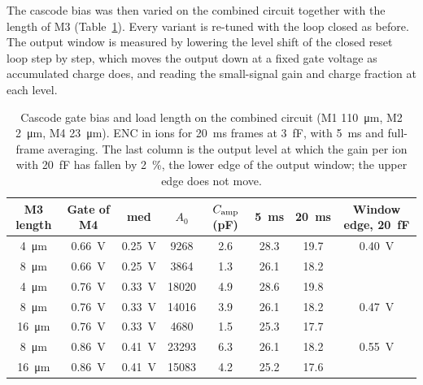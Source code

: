 \documentclass[11pt,a4paper]{article}
\begin{document}
The cascode bias was then varied on the combined circuit together with the
length of M3 (Table~\ref{tab:vh1casc}). Every variant is re-tuned with the
loop closed as before. The output window is measured by lowering the level
shift of the closed reset loop step by step, which moves the output down at
a fixed gate voltage as accumulated charge does, and reading the
small-signal gain and charge fraction at each level.
%
\begin{table}[htbp]\centering
\caption{Cascode gate bias and load length on the combined circuit (M1
\SI{110}{\um}, M2 \SI{2}{\um}, M4 \SI{23}{\um}). ENC in ions for
\SI{20}{ms} frames at \SI{3}{fF}, with \SI{5}{ms} and full-frame averaging.
The last column is the output level at which the gain per ion with
\SI{20}{fF} has fallen by \SI{2}{\percent}, the lower edge of the output
window; the upper edge does not move.}
\footnotesize
\begin{tabular}{cccccccc}
\toprule
M3 length & Gate of M4 & \textsf{med} & $A_0$ & $C_{\rm amp}$ (pF) & \SI{5}{ms} & \SI{20}{ms} & Window edge, \SI{20}{fF}\\
\midrule
\SI{4}{\um} & \SI{0.66}{V} & \SI{0.25}{V} & 9268 & 2.6 & 28.3 & 19.7 & \SI{0.40}{V}\\
\SI{8}{\um} & \SI{0.66}{V} & \SI{0.25}{V} & 3864 & 1.3 & 26.1 & 18.2 & \\
\SI{4}{\um} & \SI{0.76}{V} & \SI{0.33}{V} & 18020 & 4.9 & 28.6 & 19.8 & \\
\SI{8}{\um} & \SI{0.76}{V} & \SI{0.33}{V} & 14016 & 3.9 & 26.1 & 18.2 & \SI{0.47}{V}\\
\SI{16}{\um} & \SI{0.76}{V} & \SI{0.33}{V} & 4680 & 1.5 & 25.3 & 17.7 & \\
\SI{8}{\um} & \SI{0.86}{V} & \SI{0.41}{V} & 23293 & 6.3 & 26.1 & 18.2 & \SI{0.55}{V}\\
\SI{16}{\um} & \SI{0.86}{V} & \SI{0.41}{V} & 15083 & 4.2 & 25.2 & 17.6 & \\
\bottomrule
\end{tabular}
\label{tab:vh1casc}
\end{table}
%
\end{document}
